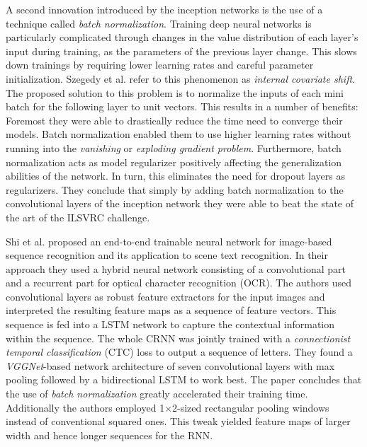 A second innovation introduced by the inception networks is the use of a technique called \emph{batch normalization}.\cite{ioffe2015batch} Training deep neural networks is particularly complicated through changes in the value distribution of each layer's input during training, as the parameters of the previous layer change. This slows down trainings by requiring lower learning rates and careful parameter initialization. Szegedy et al. refer to this phenomenon as \emph{internal covariate shift}. The proposed solution to this problem is to normalize the inputs of each mini batch for the following layer to unit vectors. This results in a number of benefits: Foremost they were able to drastically reduce the time need to converge their models. Batch normalization enabled them to use higher learning rates without running into the \emph{vanishing} or \emph{exploding gradient problem}. Furthermore, batch normalization acts as model regularizer positively affecting the generalization abilities of the network. In turn, this eliminates the need for dropout layers as regularizers. They conclude that simply by adding batch normalization to the convolutional layers of the inception network they were able to beat the state of the art of the ILSVRC challenge.

Shi et al. proposed an end-to-end trainable neural network for image-based sequence recognition and its application to scene text recognition.\cite{shi2016end} In their approach they used a hybrid neural network consisting of a convolutional part and a recurrent part for optical character recognition (OCR). The authors used convolutional layers as robust feature extractors for the input images and interpreted the resulting feature maps as a sequence of feature vectors. This sequence is fed into a LSTM network to capture the contextual information within the sequence. The whole CRNN was jointly trained with a \emph{connectionist temporal classification} (CTC) loss\cite{graves2006connectionist} to output a sequence of letters. They found a \emph{VGGNet}-based network architecture of seven convolutional layers with max pooling followed by a bidirectional LSTM to work best. The paper concludes that the use of \emph{batch normalization} greatly accelerated their training time. Additionally the authors employed 1$\times$2-sized rectangular pooling windows instead of conventional squared ones. This tweak yielded feature maps of larger width and hence longer sequences for the RNN.

